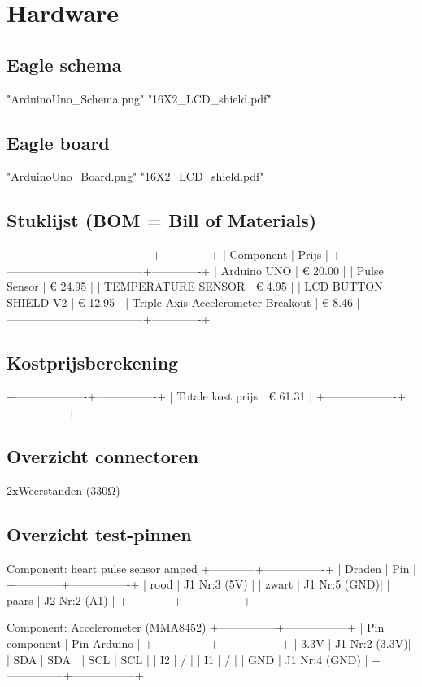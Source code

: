 \documentclass[a4paper]{report}
\begin{document}
\chapter{Hardware}
\section{Eagle schema}
"ArduinoUno_Schema.png"
"16X2_LCD_shield.pdf"

\section{Eagle board}
"ArduinoUno_Board.png"
"16X2_LCD_shield.pdf"

\section{Stuklijst (BOM = Bill of Materials)}
+------------------------------------+-------------+
|              Component             |    Prijs    |
+------------------------------------+-------------+
| Arduino UNO                        |   € 20.00   |
| Pulse Sensor                       |   € 24.95   |
| TEMPERATURE SENSOR                 |   €  4.95   |
| LCD BUTTON SHIELD V2               |   € 12.95   |
| Triple Axis Accelerometer Breakout |   €  8.46   |
+------------------------------------+-------------+


\section{Kostprijsberekening}
+-------------------+----------------+
| Totale kost prijs |    € 61.31     |
+-------------------+----------------+

\section{Overzicht connectoren}
2xWeerstanden (330Ω)

\section{Overzicht test-pinnen}
Component: heart pulse sensor amped
+------------+----------------+
|   Draden   |       Pin      |
+------------+----------------+
|   rood     | J1  Nr:3  (5V) |
|   zwart    | J1  Nr:5  (GND)|
|   paars    | J2  Nr:2  (A1) |
+------------+----------------+

Component: Accelerometer (MMA8452)
+---------------+-----------------+
| Pin component |   Pin Arduino   |
+---------------+-----------------+
|      3.3V     | J1  Nr:2  (3.3V)|
|      SDA      |       SDA       |
|      SCL      |       SCL       |
|      I2       |        /        |
|      I1       |        /        |
|      GND      | J1  Nr:4  (GND) |
+---------------+-----------------+
\end{document}
